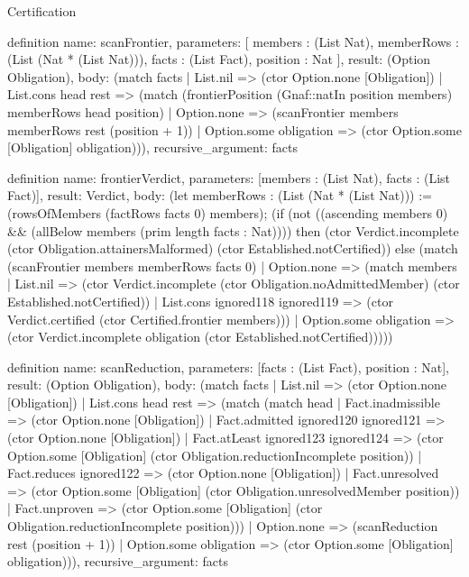\begin{lexlean}{Certification}
\begin{semanticmodule}
definition{
  name: scanFrontier,
  parameters: [
    members : (List Nat),
    memberRows : (List (Nat * (List Nat))),
    facts : (List Fact),
    position : Nat
  ],
  result: (Option Obligation),
  body: (match facts
    | List.nil => (ctor Option.none [Obligation])
    | List.cons head rest => (match (frontierPosition (Gnaf::natIn position members) memberRows head position)
      | Option.none => (scanFrontier members memberRows rest (position + 1))
      | Option.some obligation => (ctor Option.some [Obligation] obligation))),
  recursive_argument: facts
}

definition{
  name: frontierVerdict,
  parameters: [members : (List Nat), facts : (List Fact)],
  result: Verdict,
  body: (let memberRows : (List (Nat * (List Nat))) := (rowsOfMembers (factRows facts 0) members); (if (not ((ascending members 0) && (allBelow members (prim length facts : Nat)))) then (ctor Verdict.incomplete (ctor Obligation.attainersMalformed) (ctor Established.notCertified)) else (match (scanFrontier members memberRows facts 0)
    | Option.none => (match members
      | List.nil => (ctor Verdict.incomplete (ctor Obligation.noAdmittedMember) (ctor Established.notCertified))
      | List.cons ignored118 ignored119 => (ctor Verdict.certified (ctor Certified.frontier members)))
    | Option.some obligation => (ctor Verdict.incomplete obligation (ctor Established.notCertified)))))
}

definition{
  name: scanReduction,
  parameters: [facts : (List Fact), position : Nat],
  result: (Option Obligation),
  body: (match facts
    | List.nil => (ctor Option.none [Obligation])
    | List.cons head rest => (match (match head
        | Fact.inadmissible => (ctor Option.none [Obligation])
        | Fact.admitted ignored120 ignored121 => (ctor Option.none [Obligation])
        | Fact.atLeast ignored123 ignored124 => (ctor Option.some [Obligation] (ctor Obligation.reductionIncomplete position))
        | Fact.reduces ignored122 => (ctor Option.none [Obligation])
        | Fact.unresolved => (ctor Option.some [Obligation] (ctor Obligation.unresolvedMember position))
        | Fact.unproven => (ctor Option.some [Obligation] (ctor Obligation.reductionIncomplete position)))
      | Option.none => (scanReduction rest (position + 1))
      | Option.some obligation => (ctor Option.some [Obligation] obligation))),
  recursive_argument: facts
}


\end{semanticmodule}
\end{lexlean}
